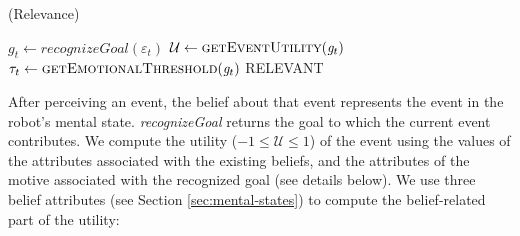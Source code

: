 \documentclass{sig-alternate-05-2015}
\begin{document}
\vspace*{-3mm}
\begin{algorithm}
	\caption{(Relevance)}
	\label{alg:relevance}
	\begin{algorithmic}[1]
			\State $\mathit{g}_{t} \gets \textit{recognizeGoal}{(\varepsilon_t)}$
			\State $\mathcal{U} \gets \Call{getEventUtility}{\mathit{g}_{t}}$ 
			\State $\tau_{t} \gets \Call{getEmotionalThreshold}{\mathit{g}_{t}}$
			 \:\Return
			{{\fontsize{7}{8}\selectfont RELEVANT}} 
			\Else \: 
			\EndIf
		\EndFunction
	\end{algorithmic}
\end{algorithm}

After perceiving an event, the belief about that event represents the event in
the robot's mental state. \textit{recognizeGoal} returns the goal to which the
current event contributes. We compute the utility ($-1 \leq \mathcal{U} \leq 1$)
of the event using the values of the attributes associated with the existing
beliefs, and the attributes of the motive associated with the recognized goal
(see details below). We use three belief attributes (see Section
\ref{sec:mental-states}) to compute the belief-related part of the utility:
\end{document}
